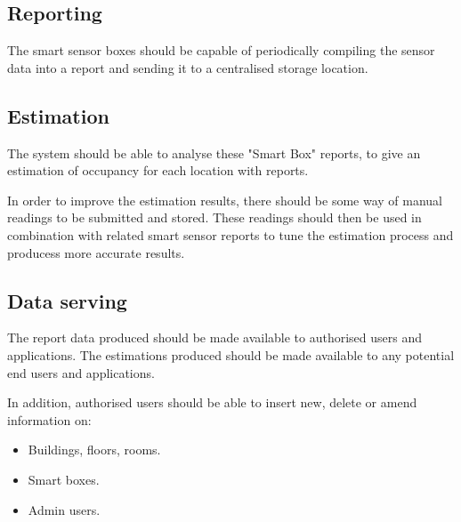 \documentclass{l4proj}
\begin{document}
\subsection{Reporting}
The smart sensor boxes should be capable of periodically compiling the sensor data into a report and sending it to a centralised storage location.

\subsection{Estimation}
The system should be able to analyse these "Smart Box" reports, to give an estimation of occupancy for each location with reports.

In order to improve the estimation results, there should be some way of manual readings to be submitted and stored. These readings should then be used in combination with related smart sensor reports to tune the estimation process and producess more accurate results.

\subsection{Data serving}
The report data produced should be made available to authorised users and applications.
The estimations produced should be made available to any potential end users and applications.

In addition, authorised users should be able to insert new, delete or amend information on:
\begin{itemize}  
  \item Buildings, floors, rooms.
  \item Smart boxes.
  \item Admin users.
\end{itemize}
\end{document}
